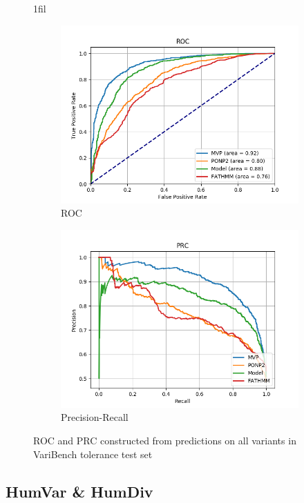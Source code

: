 \documentclass[11pt]{article}
\makeatletter
\newcommand*{\centerfloat}{%
  \parindent \z@
  \leftskip \z@ \@plus 1fil \@minus \textwidth
  \rightskip\leftskip
  \parfillskip \z@skip}
\makeatother
\begin{document}
\begin{figure}
\centerfloat
\begin{subfigure}{.8\textwidth}
  \centering
  \includegraphics[width=.9\linewidth]{ALL_same_include_all_ROC.png}
  \caption{ROC}
  \label{fig:sub1_vb}
\end{subfigure}%
\begin{subfigure}{.8\textwidth}
  \centering
  \includegraphics[width=.9\linewidth]{ALL_same_include_all_PRC.png}
  \caption{Precision-Recall}
  \label{fig:sub2_vb}
\end{subfigure}
\caption{ROC and PRC constructed from predictions on all variants in VariBench tolerance test set}
\label{fig:varibench_tolerance_roc}
\end{figure}

\subsection{HumVar \& HumDiv}
\end{document}
